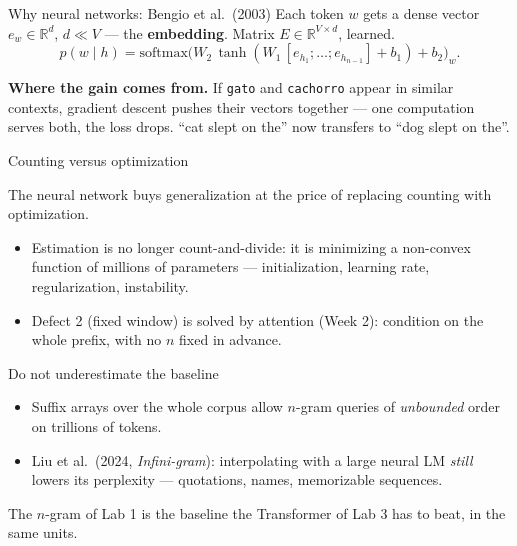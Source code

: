 \documentclass[11pt,aspectratio=169]{beamer}
\newcommand{\dest}[1]{\textcolor{structure}{\textbf{#1}}}
\begin{document}
\begin{frame}{Why neural networks: Bengio et al.\ (2003)}
  Each token $w$ gets a dense vector $e_w\in\mathbb{R}^d$, $d\ll V$ --- the
  \dest{embedding}. Matrix $E\in\mathbb{R}^{V\times d}$, learned.
  \[
    p(w\mid h) = \mathrm{softmax}\big(W_2\,\tanh(W_1\,[e_{h_1};\dots;e_{h_{n-1}}] + b_1) + b_2\big)_w .
  \]

  \vspace{0.8em}
  \textbf{Where the gain comes from.} If \texttt{gato} and \texttt{cachorro} appear in similar
  contexts, gradient descent pushes their vectors together --- one computation serves both,
  the loss drops. ``cat slept on the'' now transfers to ``dog slept on the''.
\end{frame}

\begin{frame}{Counting versus optimization}
  \begin{block}{}
    The neural network buys generalization at the price of replacing counting with
    optimization.
  \end{block}

  \vspace{1em}
  \begin{itemize}
    \item Estimation is no longer count-and-divide: it is minimizing a non-convex function
          of millions of parameters --- initialization, learning rate, regularization,
          instability.
    \item Defect 2 (fixed window) is solved by attention (Week 2): condition on the whole
          prefix, with no $n$ fixed in advance.
  \end{itemize}
\end{frame}

\begin{frame}{Do not underestimate the baseline}
  \begin{itemize}
    \item Suffix arrays over the whole corpus allow $n$-gram queries of \emph{unbounded}
          order on trillions of tokens.
    \item Liu et al.\ (2024, \emph{Infini-gram}): interpolating with a large neural LM
          \emph{still} lowers its perplexity --- quotations, names, memorizable sequences.
  \end{itemize}

  \vspace{1.2em}
  \begin{block}{}
    The $n$-gram of Lab 1 is the baseline the Transformer of Lab 3 has to beat, in the same
    units.
  \end{block}
\end{frame}
\end{document}

